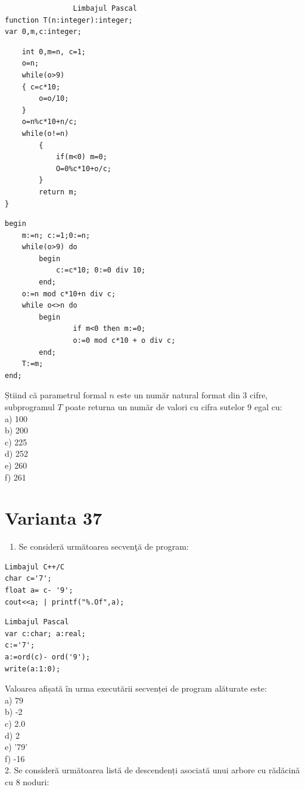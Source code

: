\documentclass[10pt]{article}
\begin{document}
\begin{verbatim}
                Limbajul Pascal
function T(n:integer):integer;
var 0,m,c:integer;
\end{verbatim}

\begin{verbatim}
    int 0,m=n, c=1;
    o=n;
    while(o>9)
    { c=c*10;
        o=o/10;
    }
    o=n%c*10+n/c;
    while(o!=n)
        {
            if(m<0) m=0;
            O=0%c*10+o/c;
        }
        return m;
}
\end{verbatim}

\begin{verbatim}
begin
    m:=n; c:=1;0:=n;
    while(o>9) do
        begin
            c:=c*10; 0:=0 div 10;
        end;
    o:=n mod c*10+n div c;
    while o<>n do
        begin
                if m<0 then m:=0;
                o:=0 mod c*10 + o div c;
        end;
    T:=m;
end;
\end{verbatim}

Știind că parametrul formal $n$ este un număr natural format din 3 cifre, subprogramul $T$ poate returna un număr de valori cu cifra sutelor 9 egal cu:\\
a) 100\\
b) 200\\
c) 225\\
d) 252\\
e) 260\\
f) 261

\section*{Varianta 37}
\begin{enumerate}
  \item Se consideră următoarea secvenţă de program:
\end{enumerate}

\begin{verbatim}
Limbajul C++/C
char c='7';
float a= c- '9';
cout<<a; | printf("%.Of",a);
\end{verbatim}

\begin{verbatim}
Limbajul Pascal
var c:char; a:real;
c:='7';
a:=ord(c)- ord('9');
write(a:1:0);
\end{verbatim}

Valoarea afișată în urma executării secvenței de program alăturate este:\\
a) 79\\
b) -2\\
c) 2.0\\
d) 2\\
e) '79'\\
f) -16\\
2. Se consideră următoarea listă de descendenți asociată unui arbore cu rădăcină cu 8 noduri:
\end{document}
